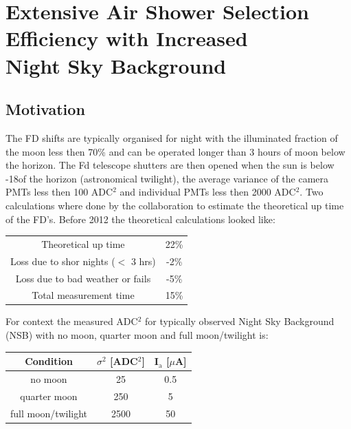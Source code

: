 \chapter[EAS Selection Efficiency with Increased NSB]{\centering Extensive Air Shower Selection Efficiency with Increased \\ Night Sky Background \\}\label{Ch:SelectEff}



\section{Motivation}

The FD shifts are typically organised for night with the illuminated fraction of the moon less then 70\% and can be operated longer than 3 hours of moon below the horizon. The Fd telescope shutters are then opened when the sun is below -18\textdegree of the horizon (astronomical twilight), the average variance of the camera PMTs less then 100 ADC$^2$ and individual PMTs less then 2000 ADC$^2$. Two calculations where done by the collaboration to estimate the theoretical up time of the FD's. Before 2012 the theoretical calculations looked like:

\begin{table}[h]
\centering
\begin{tabular}{c c}
Theoretical up time & 22\% \\
Loss due to shor nights ($<$ 3 hrs) & -2\% \\
Loss due to bad weather or fails & -5\% \\ \hline \hline
Total measurement time & 15\% 
\end{tabular}
\end{table}

For context the measured ADC$^2$ for typically observed Night Sky Background (NSB) with no moon, quarter moon and full moon/twilight is:
\begin{table}[h]
\centering
\begin{tabular}{c c c}
\hline\hline
Condition & $\sigma^2$ [ADC$^2$] & I$_{\mathrm{a}}$ [$\mu$A] \\ \hline\hline
no moon & 25 & 0.5 \\
quarter moon & 250 & 5 \\
full moon/twilight & 2500 & 50 \\ \hline\hline
\end{tabular}
\end{table}

